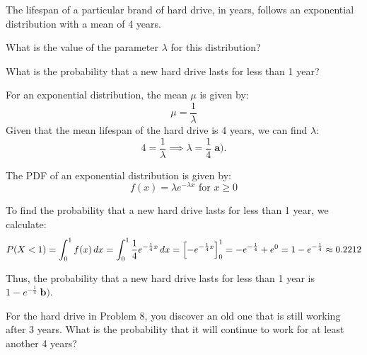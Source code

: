 \documentclass[a4paper, 10pt]{article}
\begin{document}
\begin{problem}
The lifespan of a particular brand of hard drive, in years, follows an exponential
distribution with a mean of 4 years.
\begin{subproblems_alpha}
	\item What is the value of the parameter \( \lambda \) for this distribution?
	\item What is the probability that a new hard drive lasts for less than 1 year?
\end{subproblems_alpha}
\end{problem}

\begin{solution}
	For an exponential distribution, the mean \( \mu \) is given by:
	\[ \mu = \frac{1}{\lambda} \]
	Given that the mean lifespan of the hard drive is 4 years, we can find \( \lambda \):
	\[ 4 = \frac{1}{\lambda} \implies \lambda = \boxed{\frac{1}{4}} \; \textbf{a).} \]

	The PDF of an exponential distribution is given by:
	\[ f(x) = \lambda e^{-\lambda x} \text{ for } x \geq 0 \]

	To find the probability that a new hard drive lasts for less than 1 year, we calculate:
	\[ P(X < 1) = \int_{0}^{1} f(x)\,dx = \int_{0}^{1} \frac{1}{4} e^{-\frac{1}{4} x}\,dx = \left[-e^{-\frac{1}{4} x}\right]_{0}^{1} = -e^{-\frac{1}{4}} + e^{0} = 1 - e^{-\frac{1}{4}} \approx 0.2212 \]

	Thus, the probability that a new hard drive lasts for less than 1 year is \( \boxed{1 - e^{-\frac{1}{4}}} \; \textbf{b).} \)
\end{solution}

\begin{problem}
For the hard drive in Problem 8, you discover an old one that is still working after 3 years.
What is the probability that it will continue to work for at least another 4 years?
\end{problem}
\end{document}
